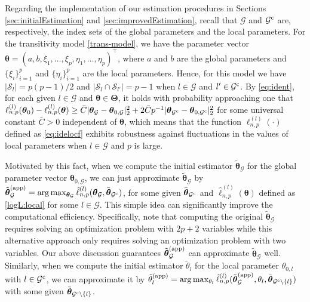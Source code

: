 \documentclass[12pt]{article}
\newcommand{\bTheta}{\boldsymbol \Theta}
\newcommand{\btheta}{\boldsymbol \theta}
\def\T{{\scriptscriptstyle \top} }
\newcommand{\btc}{{\rm c}}
\newcommand{\0}{{\bf 0}}
\begin{document}
Regarding the implementation of our estimation procedures in Sections \ref{sec:initialEstimation} and \ref{sec:improvedEstimation}, recall  that $\mathcal{G}$ and $\mathcal{G}^{\btc}$ are, respectively, the index sets of the global parameters and the local parameters. For the transitivity model \eqref{trans-model}, we have the parameter vector $\btheta=(a,b,\xi_1,\ldots,\xi_p,\eta_1,\ldots,\eta_p)^{\T}$, where $a$ and $b$ are the global parameters and $\{\xi_i\}_{i=1}^p$ and $\{\eta_i\}_{i=1}^p$ are the local parameters.  Hence, for this model we have $|\mathcal{S}_l| = p(p-1)/2$  and $|\mathcal{S}_{l}\cap\mathcal{S}_{l'}| = p-1$ when  $l\in \mathcal{G}$ and $l'\in\mathcal{G}^{\btc}$. By \eqref{eq:ident}, for each given $l\in\mathcal{G}$ and $\btheta\in\bTheta$, it holds with probability approaching one that $\ell_{n,p}^{(l)}(\btheta_0)-\ell_{n,p}^{(l)}(\btheta)\geq \bar{C}|\btheta_{\mathcal{G}}-\btheta_{0,\mathcal{G}}|_2^2+2\bar{C}p^{-1}|\btheta_{\mathcal{G}^{\btc}}-\btheta_{0,\mathcal{G}^{\btc}}|_2^2$ for some universal constant $\bar{C}>0$ independent of $\btheta$, which means that the function  $\ell_{n,p}^{(l)}(\cdot)$ defined as \eqref{eq:idelocf} exhibits robustness against fluctuations in the values of local parameters when $l\in\mathcal{G}$ and $p$ is large. 

Motivated by this fact, when we compute the initial estimator $\tilde{\btheta}_{\mathcal{G}}$  for the global parameter vector $\btheta_{0,\mathcal{G}}$, we can just approximate $\tilde{\btheta}_{\mathcal{G}}$ by $\tilde{\btheta}_{\mathcal{G}}^{({\rm app})}=\arg\max_{\btheta_{\mathcal{G}}}\hat{\ell}_{n,p}^{(l)}(\btheta_{\mathcal{G}},\bar{\btheta}_{\mathcal{G}^{\btc}})$, for some given $\bar{\btheta}_{\mathcal{G}^{\btc}}$ and $\hat{\ell}_{n,p}^{(l)}(\btheta)$ defined as \eqref{logL:local} for some $l\in\mathcal{G}$. This simple idea can significantly improve the computational efficiency. Specifically, note that computing the original $\tilde{\btheta}_{\mathcal{G}}$ requires solving an optimization problem with $2p+2$ variables while this alternative approach only requires solving an optimization problem with two variables. Our above discussion guarantees $\tilde{\btheta}_{\mathcal{G}}^{({\rm app})}$ can approximate $\tilde{\btheta}_{\mathcal{G}}$ well. 
Similarly, when we compute the initial estimator $\tilde{\theta}_l$ for the local parameter $\theta_{0,l}$ with $l\in\mathcal{G}^{\btc}$, 
we can  approximate it by $\tilde{\theta}_{l}^{({\rm app})}=\arg\max_{\theta_l}\hat{\ell}_{n,p}^{(l)}(\tilde{\btheta}_{\mathcal{G}}^{({\rm app})},  \theta_l,  \bar{\btheta}_{\mathcal{G}^{\btc}\setminus\{l\}})$ with some given $ \bar{\btheta}_{\mathcal{G}^{\btc}\setminus\{l\}}$.
\end{document}
